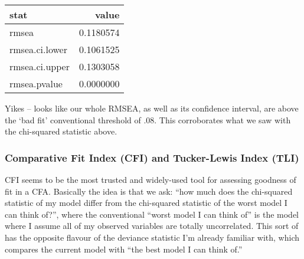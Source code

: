 \documentclass[
  letterpaper,
  DIV=11,
  numbers=noendperiod]{scrreprt}
\newenvironment{Shaded}{\begin{snugshade}}{\end{snugshade}}
\newcommand{\AttributeTok}[1]{\textcolor[rgb]{0.40,0.45,0.13}{#1}}
\newcommand{\CommentTok}[1]{\textcolor[rgb]{0.37,0.37,0.37}{#1}}
\newcommand{\FunctionTok}[1]{\textcolor[rgb]{0.28,0.35,0.67}{#1}}
\newcommand{\NormalTok}[1]{\textcolor[rgb]{0.00,0.23,0.31}{#1}}
\newcommand{\SpecialCharTok}[1]{\textcolor[rgb]{0.37,0.37,0.37}{#1}}
\newcommand{\StringTok}[1]{\textcolor[rgb]{0.13,0.47,0.30}{#1}}
\begin{document}
\begin{Shaded}
\end{Shaded}

\begin{longtable}[]{@{}lr@{}}
\toprule()
stat & value \\
\midrule()
\endhead
rmsea & 0.1180574 \\
rmsea.ci.lower & 0.1061525 \\
rmsea.ci.upper & 0.1303058 \\
rmsea.pvalue & 0.0000000 \\
\bottomrule()
\end{longtable}

Yikes -- looks like our whole RMSEA, as well as its confidence interval,
are above the `bad fit' conventional threshold of .08. This corroborates
what we saw with the chi-squared statistic above.

\hypertarget{comparative-fit-index-cfi-and-tucker-lewis-index-tli}{%
\subsubsection*{Comparative Fit Index (CFI) and Tucker-Lewis Index
(TLI)}\label{comparative-fit-index-cfi-and-tucker-lewis-index-tli}}

CFI seems to be the most trusted and widely-used tool for assessing
goodness of fit in a CFA. Basically the idea is that we ask: ``how much
does the chi-squared statistic of my model differ from the chi-squared
statistic of the worst model I can think of?'', where the conventional
``worst model I can think of'' is the model where I assume all of my
observed variables are totally uncorrelated. This sort of has the
opposite flavour of the deviance statistic I'm already familiar with,
which compares the current model with ``the best model I can think of.''
\end{document}
